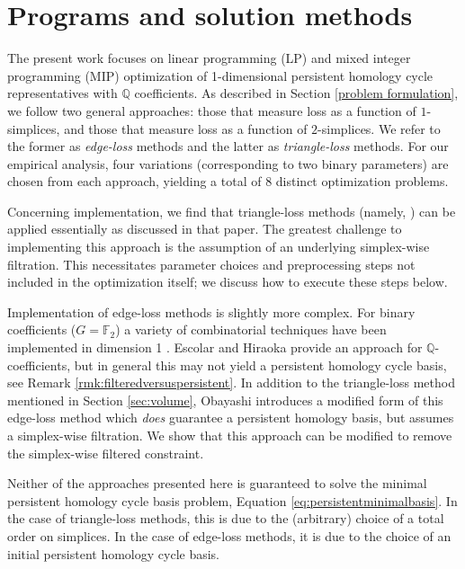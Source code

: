 \documentclass[utf8]{formatting_stuff/frontiersFPHY}
\newcommand{\Q}{\mathbb{Q}}
\newcommand{\field}{\mathbb{F}}
\newcommand{\se}{Section }
\newcommand{\eq}{Equation }
\theoremstyle{plain}
\theoremstyle{definition}
\begin{document}
\section{Programs and solution methods}\label{methodsProblems}
\label{sec:programsandmethods}

The present work focuses on linear  programming (LP) and mixed integer programming (MIP) optimization of 1-dimensional persistent homology cycle representatives with $\Q$ coefficients. As described in Section \ref{problem formulation}, we follow two general approaches: those that measure loss as a function of $1$-simplices, and those that measure loss as a function of $2$-simplices.  We refer to the former as \emph{edge-loss} methods and the latter as \emph{triangle-loss} methods.  
For our empirical analysis, four variations (corresponding to two binary parameters) are chosen from each approach, yielding a total of 8 distinct optimization problems. 


Concerning implementation, we find that triangle-loss methods (namely, \cite{Obayashi2018}) can be applied essentially as discussed in that paper.  The greatest challenge to implementing this approach is the assumption of an underlying simplex-wise filtration. This necessitates parameter choices and preprocessing steps not included in the optimization itself; we discuss how to execute these steps below.  
 
Implementation of edge-loss methods is slightly more complex.  For binary coefficients ($G = \field_2$) a variety of combinatorial techniques have been implemented in dimension 1 \cite{chenquantifying, zhang2019heuristic}.  Escolar and Hiraoka \cite{Escolar2016} provide an approach for $\Q$-coefficients, but in general this may not yield a persistent homology cycle basis, see Remark \ref{rmk:filteredversuspersistent}.   
In addition to the triangle-loss method mentioned in \se \ref{sec:volume}, Obayashi \cite{Obayashi2018} introduces a modified form of this edge-loss method which \emph{does} guarantee a persistent homology basis, but assumes a simplex-wise filtration.  We show that this approach can be modified to remove the simplex-wise filtered constraint.

Neither of the approaches presented here is guaranteed to solve the minimal persistent homology cycle basis problem, \eq \eqref{eq:persistentminimalbasis}.  In the case of triangle-loss methods, this is due to the (arbitrary) choice of a total order on simplices.  In the case of edge-loss methods, it is due to the choice of an initial persistent homology cycle basis.  
\end{document}
